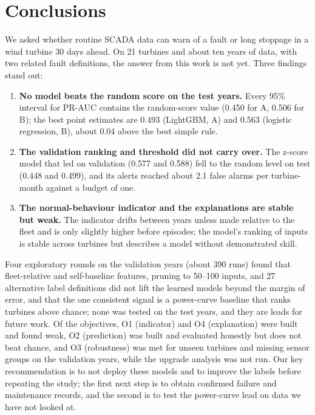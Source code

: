 \documentclass[12pt,a4paper]{article}
\begin{document}
	\section{Conclusions}
	We asked whether routine SCADA data can warn of a fault or long stoppage in a wind turbine 30 days ahead. On 21 turbines and about ten years of data, with two related fault definitions, the answer from this work is not yet. Three findings stand out:
	\begin{enumerate}
		\item \textbf{No model beats the random score on the test years.} Every 95\% interval for PR-AUC contains the random-score value (0.450 for A, 0.506 for B); the best point estimates are 0.493 (LightGBM, A) and 0.563 (logistic regression, B), about 0.04 above the best simple rule.
		\item \textbf{The validation ranking and threshold did not carry over.} The z-score model that led on validation (0.577 and 0.588) fell to the random level on test (0.448 and 0.499), and its alerts reached about 2.1 false alarms per turbine-month against a budget of one.
		\item \textbf{The normal-behaviour indicator and the explanations are stable but weak.} The indicator drifts between years unless made relative to the fleet and is only slightly higher before episodes; the model's ranking of inputs is stable across turbines but describes a model without demonstrated skill.
	\end{enumerate}
	Four exploratory rounds on the validation years (about 390 runs) found that fleet-relative and self-baseline features, pruning to 50--100 inputs, and 27 alternative label definitions did not lift the learned models beyond the margin of error, and that the one consistent signal is a power-curve baseline that ranks turbines above chance; none was tested on the test years, and they are leads for future work. Of the objectives, O1 (indicator) and O4 (explanation) were built and found weak, O2 (prediction) was built and evaluated honestly but does not beat chance, and O3 (robustness) was met for unseen turbines and missing sensor groups on the validation years, while the upgrade analysis was not run. Our key recommendation is to not deploy these models and to improve the labels before repeating the study; the first next step is to obtain confirmed failure and maintenance records, and the second is to test the power-curve lead on data we have not looked at.

	
	
\end{document}
